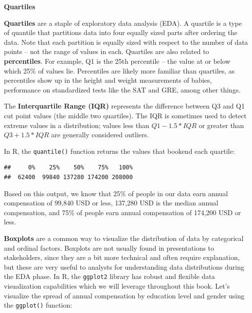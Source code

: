 \documentclass[]{book}
\newenvironment{Shaded}{\begin{snugshade}}{\end{snugshade}}
\newcommand{\CommentTok}[1]{\textcolor[rgb]{0.56,0.35,0.01}{\textit{#1}}}
\newcommand{\KeywordTok}[1]{\textcolor[rgb]{0.13,0.29,0.53}{\textbf{#1}}}
\newcommand{\NormalTok}[1]{#1}
\newcommand{\OperatorTok}[1]{\textcolor[rgb]{0.81,0.36,0.00}{\textbf{#1}}}
\begin{document}
\textbf{Quartiles}

\textbf{Quartiles} are a staple of exploratory data analysis (EDA). A quartile is a type of quantile that partitions data into four equally sized parts after ordering the data. Note that each partition is equally sized with respect to the number of data points -- not the range of values in each. Quartiles are also related to \textbf{percentiles}. For example, Q1 is the 25th percentile -- the value at or below which 25\% of values lie. Percentiles are likely more familiar than quartiles, as percentiles show up in the height and weight measurements of babies, performance on standardized tests like the SAT and GRE, among other things.

The \textbf{Interquartile Range (IQR)} represents the difference between Q3 and Q1 cut point values (the middle two quartiles). The IQR is sometimes used to detect extreme values in a distribution; values less than \(Q1 - 1.5 * IQR\) or greater than \(Q3 + 1.5 * IQR\) are generally considered outliers.

In R, the \texttt{quantile()} function returns the values that bookend each quartile:

\begin{Shaded}
\end{Shaded}

\begin{verbatim}
##     0%    25%    50%    75%   100% 
##  62400  99840 137280 174200 208000
\end{verbatim}

Based on this output, we know that 25\% of people in our data earn annual compensation of 99,840 USD or less, 137,280 USD is the median annual compensation, and 75\% of people earn annual compensation of 174,200 USD or less.

\textbf{Boxplots} are a common way to visualize the distribution of data by categorical and ordinal factors. Boxplots are not usually found in presentations to stakeholders, since they are a bit more technical and often require explanation, but these are very useful to analysts for understanding data distributions during the EDA phase. In R, the \texttt{ggplot2} library has robust and flexible data visualization capabilities which we will leverage throughout this book. Let's visualize the spread of annual compensation by education level and gender using the \texttt{ggplot()} function:
\end{document}
